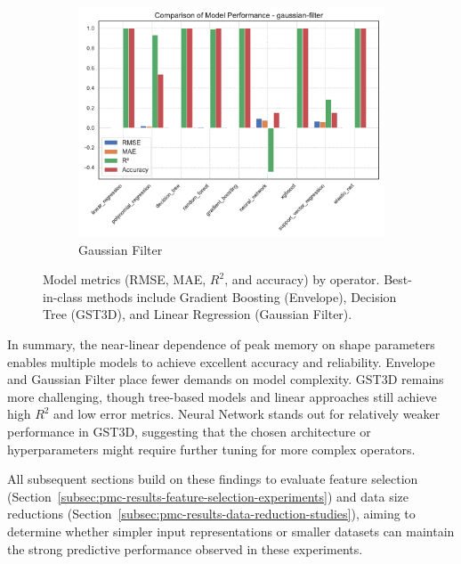 \begin{figure}[htbp]
\begin{subfigure}[t]{0.32\textwidth}
        \includegraphics[width=\textwidth]{assets/images/05/performance_by_model_gaussian-filter}
        \caption{Gaussian Filter}
    \end{subfigure}
    \caption{Model metrics (\ac{RMSE}, \ac{MAE}, $R^2$, and accuracy) by operator.
    Best-in-class methods include Gradient Boosting (Envelope), Decision Tree (\ac{GST3D}), and Linear Regression (Gaussian Filter).
    \label{fig:performance_by_model_operators}
    }
\end{figure}

In summary, the near-linear dependence of peak memory on shape parameters enables multiple models to achieve excellent accuracy and reliability.
Envelope and Gaussian Filter place fewer demands on model complexity.
\ac{GST3D} remains more challenging, though tree-based models and linear approaches still achieve high $R^2$ and low error metrics.
Neural Network stands out for relatively weaker performance in \ac{GST3D}, suggesting that the chosen architecture or hyperparameters might require further tuning for more complex operators.

All subsequent sections build on these findings to evaluate feature selection (Section~\ref{subsec:pmc-results-feature-selection-experiments}) and data size reductions (Section~\ref{subsec:pmc-results-data-reduction-studies}), aiming to determine whether simpler input representations or smaller datasets can maintain the strong predictive performance observed in these experiments.